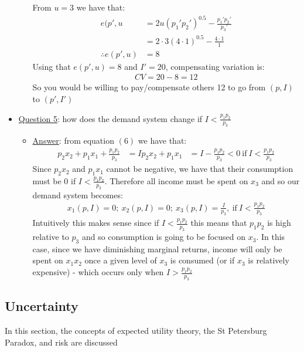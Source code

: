 \documentclass{article}
\begin{document}
\begin{itemize}
\begin{itemize}
    From $u=3$ we have that:
    \begin{align*}
      e(p',u &= 2u(p_{1}'p_{2}')^{0.5} - \frac{p_{1}'p_{2}'}{p_{3}'} \\
      &= 2 \cdot 3 (4 \cdot 1)^{0.5} - \frac{4 \cdot 1}{1} \\
      \therefore e(p',u) &= 8
    \end{align*}
    Using that $e(p',u) = 8$ and $I' = 20$, compensating variation is:
    \begin{gather*}
      CV = 20 - 8 = 12
    \end{gather*}
    So you would be willing to pay/compensate others 12 to go from $(p,I)$ to $(p',I')$
  \end{itemize}
  \item  \underline{Question 5}: how does the demand system change if $I < \tfrac{p_{1}p_{2}}{p_{3}}$
  \begin{itemize}
    \item  \underline{Answer}: from equation $(6)$ we have that:
    \begin{align*}
      p_{2}x_{2} + p_{1}x_{1} + \frac{p_{1}p_{2}}{p_{3}} &= I
      p_{2}x_{2} + p_{1}x_{1} &= I - \frac{p_{1}p_{2}}{p_{3}} < 0  \ \text{if} \ I < \frac{p_{1}p_{2}}{p_{3}}
    \end{align*}
    Since $p_{2}x_{2}$ and $p_{1}x_{1}$ cannot be negative, we have that their consumption must be $0$ if $I < \tfrac{p_{1}p_{2}}{p_{3}}$. Therefore all income must be spent on $x_{3}$ and so our demand system becomes:
    \begin{gather*}
      x_{1}(p,I) = 0; \ x_{2}(p,I) = 0; \ x_{3}(p,I) = \frac{I}{p_{3}}, \ \text{if} \  I < \frac{p_{1}p_{2}}{p_{3}}
    \end{gather*}
    Intuitively this makes sense since if $I < \tfrac{p_{1}p_{2}}{p_{3}}$ this means that $p_{1}p_{2}$ is high relative to $p_{3}$ and so consumption is going to be focused on $x_{3}$. In this case, since we have diminishing marginal returns, income will only be spent on $x_{1}x_{2}$ once a given level of $x_{3}$ is consumed (or if $x_{3}$ is relatively expensive) - which occurs only when $I > \frac{p_{1}p_{2}}{p_{3}}$
  \end{itemize}
\end{itemize}

\vspace{2.5mm}
\subsection{Uncertainty}
In this section, the concepts of expected utility theory, the St Petersburg Paradox, and risk are discussed \par
\vspace{6mm}
\end{document}
